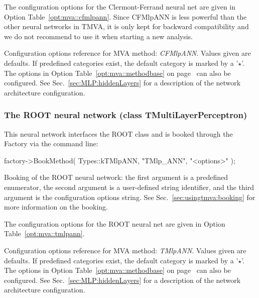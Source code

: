 The configuration options for the Clermont-Ferrand neural net are given
in Option Table~\ref{opt:mva::cfmlpann}. Since CFMlpANN is less powerful than the other neural networks in TMVA, it is only kept for backward compatibility and we do not recommend to use it when starting a new analysis.

\begin{option}[t]

\caption[.]{\optionCaptionSize 
     Configuration options reference for MVA method: {\em CFMlpANN}.
     Values given are defaults. If predefined categories exist, the default category 
     is marked by a '$\star$'. The options in Option Table~\ref{opt:mva::methodbase} on 
     page~\pageref{opt:mva::methodbase} can also be configured.     
     See Sec.~\ref{sec:MLP:hiddenLayers} for a description of the 
     network architecture configuration.
}
\label{opt:mva::cfmlpann}
\end{option}

\subsubsection*{The ROOT neural network 
                (class TMultiLayerPerceptron)}

This neural network interfaces the ROOT class  and is
booked through the Factory via the command line:
\begin{codeexample}
\begin{tmvacode}
factory->BookMethod( Types::kTMlpANN, "TMlp_ANN", "<options>" );
\end{tmvacode}
\caption[.]{\codeexampleCaptionSize Booking of the ROOT neural network: the 
            first argument is a predefined enumerator, the second argument is a 
            user-defined string identifier, and the third argument is the configuration 
            options string. See Sec.~\ref{sec:usingtmva:booking} for more information on 
            the booking.}
\end{codeexample}

The configuration options for the ROOT neural net are given in Option Table~\ref{opt:mva::tmlpann}. 
\begin{option}[t]

\caption[.]{\optionCaptionSize 
     Configuration options reference for MVA method: {\em TMlpANN}.
     Values given are defaults. If predefined categories exist, the default category 
     is marked by a '$\star$'. The options in Option Table~\ref{opt:mva::methodbase} on 
     page~\pageref{opt:mva::methodbase} can also be configured.     
     See Sec.~\ref{sec:MLP:hiddenLayers} for a description of the 
     network architecture configuration.
}
\label{opt:mva::tmlpann}
\end{option}

